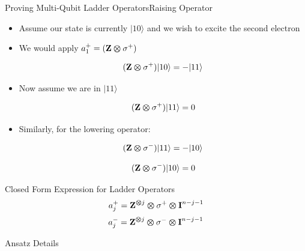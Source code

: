 \begin{frame}{Proving Multi-Qubit Ladder Operators}{Raising Operator}
    \begin{itemize}
        \item Assume our state is currently $|10\rangle$ and we wish to excite the second electron
        \item We would apply $a_1^+ = (\mbox{\bfseries{\textrm{Z}}} \bm{\otimes} \sigma^+)$

        \[(\mbox{\bfseries{\textrm{Z}}} \bm{\otimes} \sigma^+ )|10\rangle = - |11\rangle\]

        \item Now assume we are in $|11\rangle$

        \[(\mbox{\bfseries{\textrm{Z}}} \bm{\otimes} \sigma^+ )|11\rangle = 0\]
        \item Similarly, for the lowering operator: 

        \[(\mbox{\bfseries{\textrm{Z}}} \bm{\otimes} \sigma^-) |11\rangle = -|10\rangle\]

        \[(\mbox{\bfseries{\textrm{Z}}} \bm{\otimes} \sigma^-) |10\rangle = 0\]
    \end{itemize}
\end{frame}

\begin{frame}{Closed Form Expression for Ladder Operators}
    \begin{equation}
        a_j^+ = \mbox{\bfseries{\textrm{Z}}}^{\bm{\otimes} j}\bm{\otimes} \sigma^+ \bm{\otimes} \mbox{\bfseries{\textrm{I}}}^{n-j-1}
    \end{equation}
    \begin{equation}
        a_j^- = \mbox{\bfseries{\textrm{Z}}}^{\bm{\otimes} j}\bm{\otimes} \sigma^- \bm{\otimes} \mbox{\bfseries{\textrm{I}}}^{n-j-1}
    \end{equation}
\end{frame}

\begin{frame}{Ansatz Details}
    
\end{frame}







